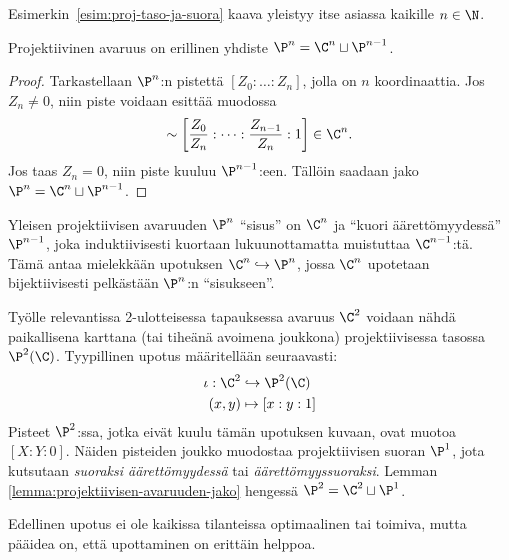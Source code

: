 Esimerkin~\ref{esim:proj-taso-ja-suora} kaava yleistyy itse asiassa kaikille $n\in\N$.
\begin{lemma}
    \label{lemma:projektiivisen-avaruuden-jako}
    Projektiivinen avaruus on erillinen yhdiste $\P^{n}=\C^n\sqcup\P^{n-1}$.
\end{lemma}
\begin{proof}
    Tarkastellaan $\P^{n}$:n pistettä $[Z_0:\dots:Z_{n}]$, jolla on $n$ koordinaattia. Jos $Z_{n}\neq 0$, niin piste voidaan esittää muodossa
    \begin{equation*}
        [Z_0:\dots:Z_n] \sim \left[\frac{Z_0}{Z_n}:\dots:\frac{Z_{n-1}}{Z_n}:1\right] \in \C^n.
    \end{equation*}
    Jos taas $Z_n=0$, niin piste kuuluu $\P^{n-1}$:een. Tällöin saadaan jako $\P^{n}=\C^n\sqcup\P^{n-1}$.
\end{proof}
Yleisen projektiivisen avaruuden $\P^n$ ``sisus'' on $\C^n$ ja ``kuori äärettömyydessä'' $\P^{n-1}$, joka induktiivisesti kuortaan lukuunottamatta muistuttaa $\C^{n-1}$:tä. Tämä antaa mielekkään upotuksen $\C^n\hookrightarrow\P^n$, jossa $\C^n$ upotetaan bijektiivisesti pelkästään $\P^n$:n ``sisukseen''.

Työlle relevantissa 2-ulotteisessa tapauksessa avaruus $\C^2$ voidaan nähdä paikallisena karttana (tai tiheänä avoimena joukkona) projektiivisessa tasossa $\P^2(\C)$. Tyypillinen upotus määritellään seuraavasti:
\begin{align*}
    \iota : \C^2 &\hookrightarrow \P^2(\C) \\
    (x,y) &\mapsto [x : y : 1]
\end{align*}
Pisteet $\P^2$:ssa, jotka eivät kuulu tämän upotuksen kuvaan, ovat muotoa $[X:Y:0]$. Näiden pisteiden joukko muodostaa projektiivisen suoran $\P^1$, jota kutsutaan \emph{suoraksi äärettömyydessä} tai \emph{äärettömyyssuoraksi}. Lemman \ref{lemma:projektiivisen-avaruuden-jako} hengessä $\P^2=\C^2\sqcup\P^1$.

Edellinen upotus ei ole kaikissa tilanteissa optimaalinen tai toimiva, mutta pääidea on, että upottaminen on erittäin helppoa.

